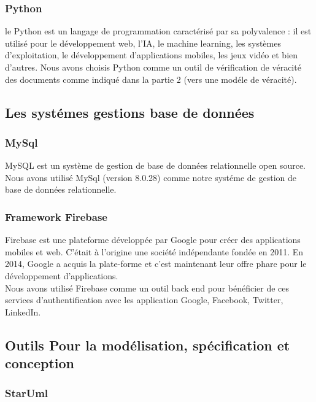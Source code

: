 \documentclass[12pt]{report}
\begin{document}
\subsubsection{Python}

le Python est un langage de programmation caractérisé par sa polyvalence : il est utilisé pour le développement web, l’IA, le machine learning, les systèmes d’exploitation, le développement d’applications mobiles, les jeux vidéo et bien d’autres.
Nous avons choisis Python comme un outil de vérification de véracité des documents comme indiqué dans la partie 2 (vers une modéle de véracité).

\subsection{Les systémes gestions base de données} 

\subsubsection{MySql}

MySQL est un système de gestion de base de données relationnelle open source. Nous avons utilisé MySql (version 8.0.28) comme notre systéme de gestion de base de données relationnelle.

\subsubsection{Framework Firebase}

Firebase est une plateforme développée par Google pour créer des applications mobiles et web. C'était à l'origine une société indépendante fondée en 2011. En 2014, Google a acquis la plate-forme et c'est maintenant leur offre phare pour le développement d'applications\cite{26}.\\
Nous avons utilisé Firebase comme un outil back end pour bénéficier de ces services d'authentification avec les application Google, Facebook, Twitter, LinkedIn.

\subsection{Outils Pour la modélisation, spécification et conception}

\subsubsection{StarUml}
\end{document}
